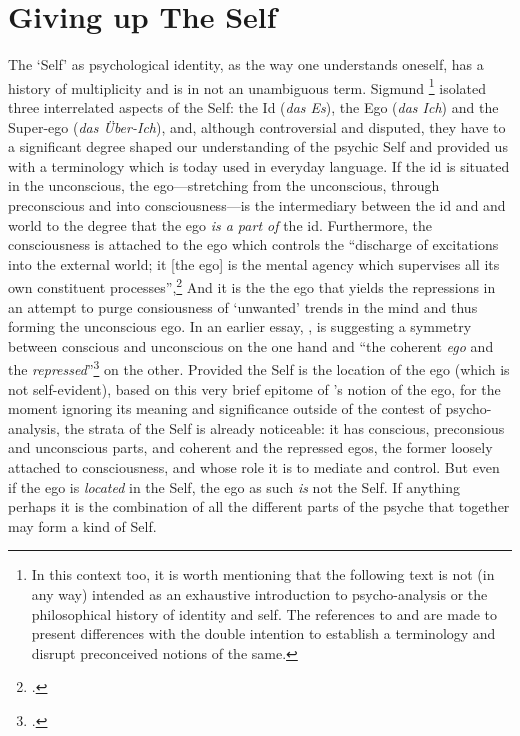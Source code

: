 \section{Giving up The Self}
\label{sec:inter-prod}

The `Self' as psychological identity, as the way one understands oneself, has a history of multiplicity and is in not an unambiguous term. Sigmund \citeauthor{freud27}\footnote{In this context too, it is worth mentioning that the following text is not (in any way) intended as an exhaustive introduction to psycho-analysis or the philosophical history of identity and self. The references to \citeauthor{freud61} and \citeauthor{sartre43} are made to present differences with the double intention to establish a terminology and disrupt preconceived notions of the same.} isolated three interrelated aspects of the Self: the Id (\emph{das Es}), the Ego (\emph{das Ich}) and the Super-ego (\emph{das \"{U}ber-Ich}), and, although controversial and disputed, they have to a significant degree shaped our understanding of the psychic Self and provided us with a terminology which is today used in everyday language. If the id is situated in the unconscious, the ego---stretching from the unconscious, through preconscious and into consciousness---is the intermediary between the id and and world to the degree that the ego \emph{is a part of} the id. Furthermore, the consciousness is attached to the ego which controls the ``discharge of excitations into the external world; it [the ego] is the mental agency which supervises all its own constituent processes'',\footcite[8]{freud61} And it is the the ego that yields the repressions in an attempt to purge consiousness of `unwanted' trends in the mind and thus forming the unconscious ego. In an earlier essay, , \citeauthor{freud61} is suggesting a symmetry between conscious and unconscious on the one hand and ``the coherent \emph{ego} and the \emph{repressed}''\footcite[13]{freud27} on the other. Provided the Self is the location of the ego (which is not self-evident), based on this very brief epitome of \citeauthor{freud27}'s notion of the ego, for the moment ignoring its meaning and significance outside of the contest of psycho-analysis, the strata of the Self is already noticeable: it has conscious, preconsious and unconscious parts, and coherent and the repressed egos, the former loosely attached to consciousness, and whose role it is to mediate and control. But even if the ego is \emph{located} in the Self, the ego as such \emph{is} not the Self. If anything perhaps it is the combination of all the different parts of the psyche that together may form a kind of Self. 

